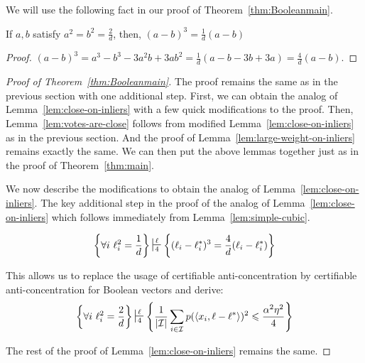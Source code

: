 We will use the following fact in our proof of Theorem~\ref{thm:Booleanmain}.

\begin{lemma}
If $a,b$ satisfy $a^2 = b^2 = \frac{2}{d}$, then, 
$
(a- b)^{3} = \frac{1}{d} (a - b)
$ \label{lem:simple-cubic}
\end{lemma}
\begin{proof}
$(a-b)^3 = a^3 - b^3 - 3a^2 b + 3ab^2 = \frac{1}{d}(a-b-3b+3a) = \frac{4}{d}(a-b)$.
\end{proof}




\begin{proof}[Proof of Theorem~\ref{thm:Booleanmain}]
The proof remains the same as in the previous section with one additional step. 
First, we can obtain the analog of Lemma~\ref{lem:close-on-inliers} with a few quick modifications to the proof. 
Then, Lemma~\ref{lem:votes-are-close} follows from modified Lemma~\ref{lem:close-on-inliers} as in the previous section. 
And the proof of Lemma~\ref{lem:large-weight-on-inliers} remains exactly the same. 
We can then put the above lemmas together just as in the proof of Theorem~\ref{thm:main}. 

We now describe the modifications to obtain the analog of Lemma~\ref{lem:close-on-inliers}. 
The key additional step in the proof of the analog of Lemma~\ref{lem:close-on-inliers} which follows immediately from Lemma~\ref{lem:simple-cubic}.

\[
\Set{\forall i\text{ } \ell_i^2 = \frac{1}{d}} \sststile{4}{\ell} \Set{ (\ell_i - \ell_i^*)^{3} = \frac{4}{d} (\ell_i - \ell_i^*)}
\]

This allows us to replace the usage of certifiable anti-concentration by certifiable anti-concentration for Boolean vectors and derive:
\[
\Set{\forall i\text{ } \ell_i^2 = \frac{2}{d}} \sststile{4}{\ell} \Set{\frac{1}{|\cI|}\sum_{i \in \cI} p(\iprod{x_i,\ell-\ell^*})^2 \leq \frac{\alpha^2 \eta^2}{4} }
\]

The rest of the proof of Lemma~\ref{lem:close-on-inliers} remains the same. 




\end{proof}


